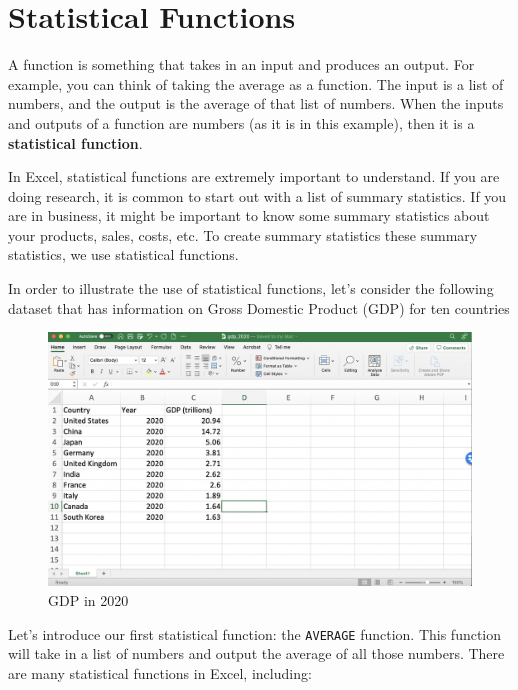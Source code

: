 \documentclass[
]{book}
\begin{document}
\hypertarget{statistical-functions}{%
\section{Statistical Functions}\label{statistical-functions}}

A function is something that takes in an input and produces an output. For example, you can think of taking the average as a function. The input is a list of numbers, and the output is the average of that list of numbers. When the inputs and outputs of a function are numbers (as it is in this example), then it is a \textbf{statistical function}.

In Excel, statistical functions are extremely important to understand. If you are doing research, it is common to start out with a list of summary statistics. If you are in business, it might be important to know some summary statistics about your products, sales, costs, etc. To create summary statistics these summary statistics, we use statistical functions.

In order to illustrate the use of statistical functions, let's consider the following dataset that has information on Gross Domestic Product (GDP) for ten countries

\begin{figure}

{\centering \includegraphics[width=1\linewidth]{images/01_gdp2020} 

}

\caption{GDP in 2020}\label{fig:gdp2020}
\end{figure}

Let's introduce our first statistical function: the \texttt{AVERAGE} function. This function will take in a list of numbers and output the average of all those numbers. There are many statistical functions in Excel, including:
\end{document}
